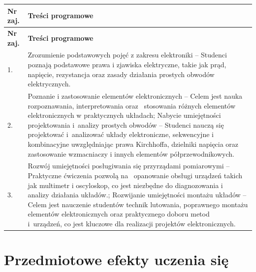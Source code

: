 \documentclass[12pt, a4paper]{article}
\newcommand{\thdrule}{\noalign{\global\setlength{\extrarowheight}{0pt}}}
\newcommand{\thdend}{\noalign{\global\setlength{\extrarowheight}{3pt}}}
\begin{document}
{\scriptsize
\begin{longtable}{m{1.5cm}m{14.5cm}}
\thdrule\toprule
\rowcolor{pjatkRed} {\color{white}\textbf{Nr zaj.}} & {\color{white}\textbf{Treści programowe}} \\
\midrule\thdend
\endfirsthead
\thdrule\toprule
\rowcolor{pjatkRed} {\color{white}\textbf{Nr zaj.}} & {\color{white}\textbf{Treści programowe}} \\
\midrule\thdend
\endhead
  \rowcolor{tableRowLight} 1. & Zrozumienie podstawowych pojęć z zakresu elektroniki – Studenci poznają podstawowe prawa i zjawiska elektryczne, takie jak prąd, napięcie, rezystancja oraz zasady działania prostych obwodów elektrycznych. \\
  \rowcolor{tableRowAlt} 2. & Poznanie i zastosowanie elementów elektronicznych – Celem jest nauka rozpoznawania, interpretowania oraz  stosowania różnych elementów elektronicznych w praktycznych układach; Nabycie umiejętności projektowania i analizy prostych obwodów – Studenci nauczą się projektować i analizować układy elektroniczne, sekwencyjne i kombinacyjne uwzględniając prawa Kirchhoffa, dzielniki napięcia oraz  zastosowanie wzmacniaczy i innych elementów półprzewodnikowych. \\
  \rowcolor{tableRowLight} 3. & Rozwój umiejętności posługiwania się przyrządami pomiarowymi – Praktyczne ćwiczenia pozwolą na  opanowanie obsługi urządzeń takich jak multimetr i oscyloskop, co jest niezbędne do diagnozowania i  analizy działania układów.; Rozwijanie umiejętności montażu układów – Celem jest nauczenie studentów technik lutowania, poprawnego montażu elementów elektronicznych oraz praktycznego doboru metod  i urządzeń, co jest kluczowe dla realizacji projektów elektronicznych. \\
\bottomrule
\end{longtable}}

\section{Przedmiotowe efekty uczenia się}
\end{document}
